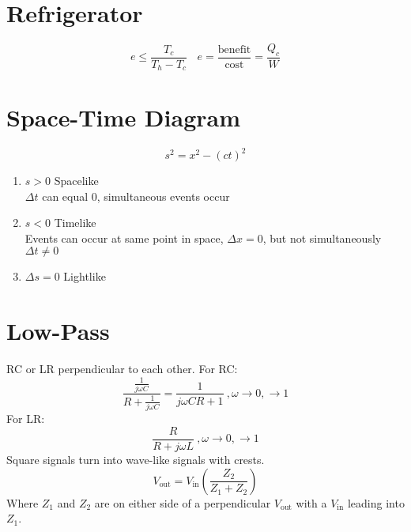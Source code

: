 \documentclass[10pt,a4paper]{article}
\begin{document}
\section{Refrigerator} %
\label{sec:refrigerator}
\begin{equation}
    e \leq \frac{T_c}{T_h - T_c} ~~~~ e = \frac{\textrm{benefit}}{\textrm{cost}} = \frac{Q_c}{W}
\end{equation}

\section{Space-Time Diagram} %
\label{sec:space_time_diagram}
\begin{equation}
    s^2 = x^2 - (ct)^2
\end{equation}
\begin{enumerate}
    \item $s>0$ Spacelike\\
    $\Delta t$ can equal 0, simultaneous events occur
    \item $s<0$ Timelike\\
    Events can occur at same point in space, $ \Delta x = 0$, but not simultaneously $ \Delta t \neq 0$
    \item $\Delta s = 0$ Lightlike
\end{enumerate}

\section{Low-Pass} %
\label{sec:low_pass}
RC or LR perpendicular to each other. For RC:
\begin{equation}
   \frac{ \frac{1}{j \omega C} }{R + \frac{1}{j\omega C}} = \frac{1}{j \omega CR + 1}~, \omega \rightarrow 0, \rightarrow 1
\end{equation}
For LR:
\begin{equation}
    \frac{R}{R + j \omega L}~, \omega \rightarrow 0,\rightarrow 1
\end{equation}
Square signals turn into wave-like signals with crests. 
\begin{equation}
    V_{\textrm{out}} = V_{\textrm{in}} \left( \frac{Z_2}{Z_1 + Z_2} \right) 
\end{equation}
Where $Z_1$ and $Z_2$ are on either side of a perpendicular $V_{\textrm{out}}$ with a $V_{\textrm{in}}$ leading into $Z_1$.
\end{document}

